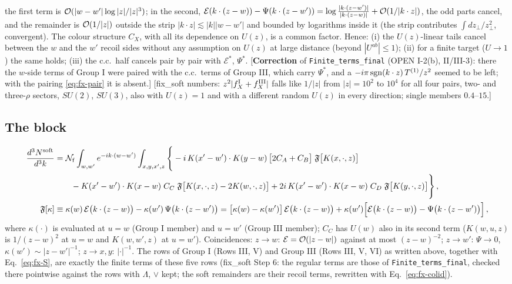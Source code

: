 \documentclass[9pt]{article}
\numberwithin{equation}{section}
\begin{document}
{the first term is ${\cal O}(|w-w'|\log|z|/|z|^{3})$; in the second, $\mathcal{E}(k\cdot(z-w))-\Psi(k\cdot(z-w'))=\log\frac{|k\cdot(z-w')|}{|k\cdot(z-w)|}+{\cal O}(1/|k\cdot z|)$, the odd parts cancel, and the remainder is ${\cal O}(1/|z|)$ outside the strip $|k\cdot z|\lesssim|k||w-w'|$ and bounded by logarithms inside it (the strip contributes $\int dz_{\perp}/z_{\perp}^{2}$, convergent). The colour structure $C_{X}$, with all its dependence on $U(z)$, is a common factor. Hence: (i) the $U(z)$-linear tails cancel between the $w$ and the $w'$ recoil sides without any assumption on $U(z)$ at large distance (beyond $|U^{ab}|\le1$); (ii) for a finite target ($U\to1$) the same holds; (iii) the c.c.\ half cancels pair by pair with $\mathcal{E}^{*}$, $\Psi^{*}$. [\textbf{Correction} of \texttt{Finite\_terms\_final} (OPEN I-2(b), II/III-3): there the $w$-side terms of Group I were paired with the c.c.\ terms of Group III, which carry $\Psi^{*}$, and a $-i\pi\,{\rm sgn}(k\cdot z)\,T^{(1)}/z^{2}$ seemed to be left; with the pairing \eqref{eq:fx-pair} it is absent.] [fix\_soft numbers: $z^{2}|f^{\rm I}_{X}+f^{\rm III}_{X}|$ falls like $1/|z|$ from $|z|=10^{2}$ to $10^{4}$ for all four pairs, two- and three-$\rho$ sectors, $SU(2)$, $SU(3)$, also with $U(z)=1$ and with a different random $U(z)$ in every direction; single members $0.4$--$15$.]

\subsection*{The block}
\begin{align}
\frac{d^{3}N^{\rm soft}}{d^{3}k}&=\mathcal{N}_{\rm f}\int_{w,w'}e^{-ik\cdot(w-w')}\int_{x,y,x',z}\Bigg\{-i\,K(x'-w')\cdot K(y-w)\,\big[2C_{A}+C_{B}\big]\;\mathfrak{F}\big[K(x,\cdot,z)\big]\notag\\
&\qquad-K(x'-w')\cdot K(x-w)\;C_{C}\;\mathfrak{F}\big[K(x,\cdot,z)-2K(w,\cdot,z)\big]+2i\,K(x'-w')\cdot K(x-w)\;C_{D}\;\mathfrak{F}\big[K(y,\cdot,z)\big]\Bigg\}\,,\label{eq:fx-S}\\
\mathfrak{F}[\kappa]&\equiv\kappa(w)\,\mathcal{E}\big(k\cdot(z-w)\big)-\kappa(w')\,\Psi\big(k\cdot(z-w')\big)=\big[\kappa(w)-\kappa(w')\big]\,\mathcal{E}\big(k\cdot(z-w)\big)+\kappa(w')\Big[\mathcal{E}\big(k\cdot(z-w)\big)-\Psi\big(k\cdot(z-w')\big)\Big]\,,\notag
\end{align}
where $\kappa(\cdot)$ is evaluated at $u=w$ (Group I member) and $u=w'$ (Group III member); $C_{C}$ has $U(w)$ also in its second term ($K(w,u,z)$ is $1/(z-w)^{2}$ at $u=w$ and $K(w,w',z)$ at $u=w'$). Coincidences: $z\to w$: $\mathcal{E}={\cal O}(|z-w|)$ against at most $(z-w)^{-2}$; $z\to w'$: $\Psi\to0$, $\kappa(w')\sim|z-w'|^{-1}$; $z\to x,y$: $|\cdot|^{-1}$. The rows of Group I (Rows III, V) and Group III (Rows III, V, VI) as written above, together with Eq.~\eqref{eq:fx-S}, are exactly the finite terms of these five rows (fix\_soft Step 6: the regular terms are those of \texttt{Finite\_terms\_final}, checked there pointwise against the rows with $\Lambda$, $\vee$ kept; the soft remainders are their recoil terms, rewritten with Eq.~\eqref{eq:fx-colid}).

}
\end{document}
